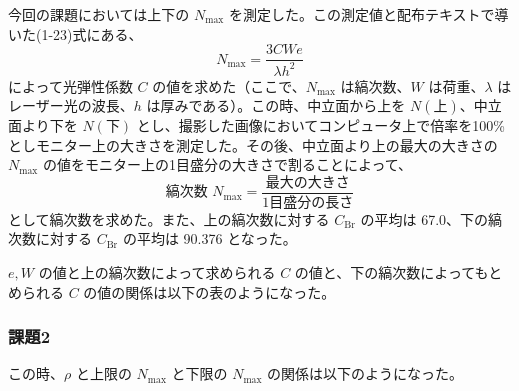 \documentclass[uplatex,dvipdfmx,titlepage]{jsarticle}
\begin{document}
今回の課題においては上下の $N_{\text{max}}$ を測定した。この測定値と配布テキストで導いた(1-23)式にある、
\[
  N_{\text{max}} = \frac{3CWe}{\lambda h^2}
\]
によって光弾性係数 $C$ の値を求めた（ここで、$N_{\text{max}}$ は縞次数、$W$ は荷重、$\lambda$ はレーザー光の波長、$h$ は厚みである）。この時、中立面から上を $N(\text{上})$、中立面より下を $N(\text{下})$ とし、撮影した画像においてコンピュータ上で倍率を100\%としモニター上の大きさを測定した。その後、中立面より上の最大の大きさの $N_{\text{max}}$ の値をモニター上の1目盛分の大きさで割ることによって、
\[
  \text{縞次数 } N_{\text{max}} = \frac{\text{最大の大きさ}}{\text{1目盛分の長さ}}
\]
として縞次数を求めた。また、上の縞次数に対する $C_{\text{Br}}$ の平均は 67.0、下の縞次数に対する $C_{\text{Br}}$ の平均は 90.376 となった。

$e, W$ の値と上の縞次数によって求められる $C$ の値と、下の縞次数によってもとめられる $C$ の値の関係は以下の表のようになった。

\begin{table}[H]
    \centering
\end{table}

\subsubsection*{課題2}
この時、$\rho$ と上限の $N_{\text{max}}$ と下限の $N_{\text{max}}$ の関係は以下のようになった。
\end{document}
